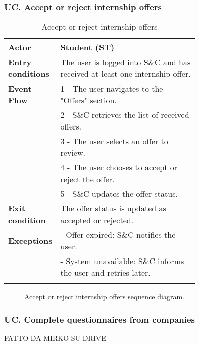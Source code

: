 \subsubsection*{UC\cuc . Accept or reject internship offers}
\begin{center}
    \begin{longtable}{|l|p{0.75\linewidth}|}
        \hline
        \textbf{Actor}            & Student (ST) \\
        \hline
        \textbf{Entry conditions} & The user is logged into S\&C and has received at least one internship offer. \\
        \hline
        \textbf{Event Flow}       & 1 - The user navigates to the "Offers" section. \\
        & 2 - S\&C retrieves the list of received offers. \\
        & 3 - The user selects an offer to review. \\
        & 4 - The user chooses to accept or reject the offer. \\
        & 5 - S\&C updates the offer status. \\
        \hline
        \textbf{Exit condition}   & The offer status is updated as accepted or rejected. \\       
        \hline
        \textbf{Exceptions}       & - Offer expired: S\&C notifies the user. \\
                                  & - System unavailable: S\&C informs the user and retries later. \\
        \hline
        \caption{Accept or reject internship offers}
        \label{tab:accept_reject_offers_usecase}
    \end{longtable}
\end{center}

\begin{figure}[H]
    \begin{center}
        
        \caption{Accept or reject internship offers sequence diagram.}
        \label{fig:accept_reject_offers_seqd}%
    \end{center}
\end{figure}

\subsubsection*{UC\cuc . Complete questionnaires from companies}
FATTO DA MIRKO SU DRIVE

